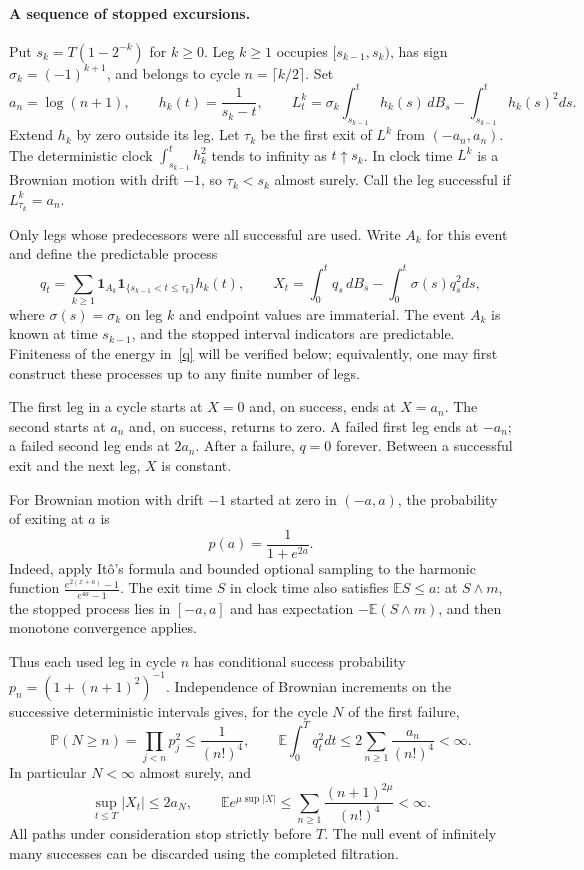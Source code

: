 \documentclass[11pt]{article}
\begin{document}
\paragraph{A sequence of stopped excursions.}
Put $s_k=T(1-2^{-k})$ for $k\geq0$. Leg $k\geq1$ occupies $[s_{k-1},s_k)$, has sign $\sigma_k=(-1)^{k+1}$, and belongs to cycle $n=\lceil k/2\rceil$. Set
\[
 a_n=\log(n+1),\qquad h_k(t)=\frac1{s_k-t},\qquad
 L^k_t=\sigma_k\int_{s_{k-1}}^t h_k(s)\,dB_s
            -\int_{s_{k-1}}^t h_k(s)^2ds.
\]
Extend $h_k$ by zero outside its leg. Let $\tau_k$ be the first exit of $L^k$ from $(-a_n,a_n)$. The deterministic clock $\int_{s_{k-1}}^t h_k^2$ tends to infinity as $t\uparrow s_k$. In clock time $L^k$ is a Brownian motion with drift $-1$, so $\tau_k<s_k$ almost surely. Call the leg successful if $L^k_{\tau_k}=a_n$.

Only legs whose predecessors were all successful are used. Write $A_k$ for this event and define the predictable process
\begin{equation}\label{q}
 q_t=\sum_{k\geq1}\mathbf1_{A_k}\mathbf1_{\{s_{k-1}<t\leq\tau_k\}}h_k(t),
 \qquad
 X_t=\int_0^t q_s\,dB_s-\int_0^t\sigma(s)q_s^2ds,
\end{equation}
where $\sigma(s)=\sigma_k$ on leg $k$ and endpoint values are immaterial. The event $A_k$ is known at time $s_{k-1}$, and the stopped interval indicators are predictable. Finiteness of the energy in~\eqref{q} will be verified below; equivalently, one may first construct these processes up to any finite number of legs.

The first leg in a cycle starts at $X=0$ and, on success, ends at $X=a_n$. The second starts at $a_n$ and, on success, returns to zero. A failed first leg ends at $-a_n$; a failed second leg ends at $2a_n$. After a failure, $q=0$ forever. Between a successful exit and the next leg, $X$ is constant.

For Brownian motion with drift $-1$ started at zero in $(-a,a)$, the probability of exiting at $a$ is
\[
 p(a)=\frac1{1+e^{2a}}.
\]
Indeed, apply It\^o's formula and bounded optional sampling to the harmonic function
$\frac{e^{2(x+a)}-1}{e^{4a}-1}$. The exit time $S$ in clock time also satisfies $\mathbb E S\leq a$: at $S\wedge m$, the stopped process lies in $[-a,a]$ and has expectation $-\mathbb E(S\wedge m)$, and then monotone convergence applies.

Thus each used leg in cycle $n$ has conditional success probability
$p_n=(1+(n+1)^2)^{-1}$. Independence of Brownian increments on the successive deterministic intervals gives, for the cycle $N$ of the first failure,
\begin{equation}\label{tails}
 \mathbb P(N\geq n)=\prod_{j<n}p_j^2\leq\frac1{(n!)^4},\qquad
 \mathbb E\int_0^Tq_t^2dt\leq2\sum_{n\geq1}\frac{a_n}{(n!)^4}<\infty.
\end{equation}
In particular $N<\infty$ almost surely, and
\begin{equation}\label{maximum}
 \sup_{t\leq T}|X_t|\leq2a_N,\qquad
 \mathbb E e^{\mu\sup|X|}\leq\sum_{n\geq1}\frac{(n+1)^{2\mu}}{(n!)^4}<\infty.
\end{equation}
All paths under consideration stop strictly before $T$. The null event of infinitely many successes can be discarded using the completed filtration.
\end{document}
